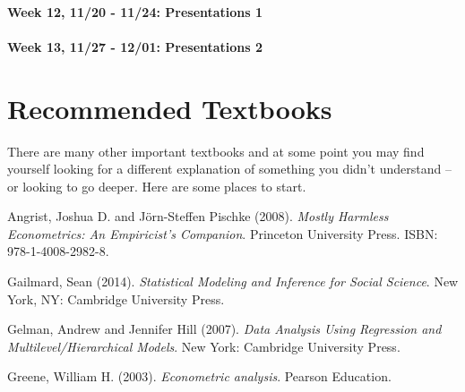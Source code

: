 \documentclass[11pt,]{article}
\begin{document}
\paragraph{Week 12, 11/20 - 11/24: Presentations
1}\label{week-12-1120---1124-presentations-1}

\paragraph{Week 13, 11/27 - 12/01: Presentations
2}\label{week-13-1127---1201-presentations-2}

\section{Recommended Textbooks}\label{recommended-textbooks}

There are many other important textbooks and at some point you may find
yourself looking for a different explanation of something you didn't
understand -- or looking to go deeper. Here are some places to start.

 Angrist, Joshua D. and Jörn-Steffen Pischke (2008).
\emph{Mostly Harmless Econometrics: An Empiricist's Companion}.
Princeton University Press. ISBN: 978-1-4008-2982-8.

 Gailmard, Sean (2014).
\emph{Statistical Modeling and Inference for Social Science}. New York,
NY: Cambridge University Press.

 Gelman, Andrew and Jennifer Hill (2007).
\emph{Data Analysis Using Regression and
Multilevel/Hierarchical Models}. New York: Cambridge University Press.

 Greene, William H. (2003).
\emph{Econometric analysis}. Pearson Education.
\end{document}
